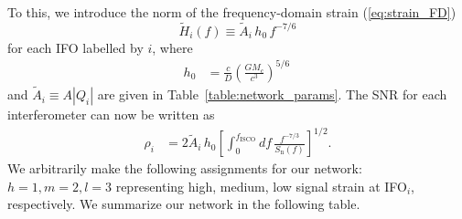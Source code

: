 \documentclass[prd,amsmath,amssymb,aps,floats,amsfonts,notitlepage,superscriptaddress,eqsecnum,nofootinbib,10pt]{revtex4-1}
\newcommand{\f}{\frac}
\newcommand{\be}{\begin{equation}}
\newcommand{\ee}{\end{equation}}
\begin{document}
%
%
To this, we introduce the norm of the frequency-domain strain (\ref{eq:strain_FD}) 
%
\be
\tilde{H}_i(f)\equiv \tilde{A}_i\, h_0\, f^{-7/6} \label{eq:Hi_s}
\ee
%
for each IFO labelled by $i$, where
%
\begin{align}
h_0 &= \f{c}{D}\left(\f{G M_c}{c^3}\right)^{5/6} \label{eq:h0}\, 
\end{align}
%
and $\tilde{A}_i\equiv A |Q_i|$ %
are given in Table~\ref{table:network_params}. %
The SNR for each interferometer can now be written as
%
\begin{align}
\rho_i &= 2\tilde{A}_i\, h_0 \left[\int_0^{f_\text{ISCO}} df\, \f{f^{-7/3}}{S_\text{n}(f)} \right]^{1/2}\label{eq:SNR_i}.
\end{align}
%
We arbitrarily make the following assignments for our network: $h=1, m=2, l=3$ representing high, medium, low signal strain
at IFO$_i$, respectively. 
We summarize our network in the following table.
\end{document}
